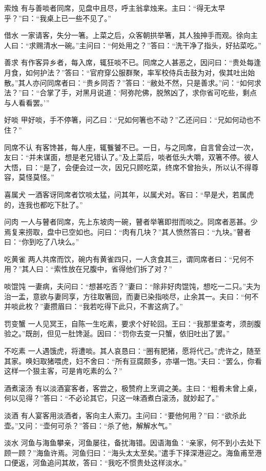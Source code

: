 \documentclass[12pt,UTF8]{ctexbook}
\begin{document}
索烛
有与善啖者同席，见盘中且尽，呼主翁拿烛来。主曰：“得无太早乎？”曰：“我桌上已一些不见了。”

借水
一家请客，失分一箸。上菜之后，众客朝拱举箸，其人独抻手而观。徐向主人曰：“求赐清水一碗。”主问曰：“何处用之？”答曰：“洗干净了指头，好拈菜吃。”

善求
有作客异乡者，每入席，辄狂啖不已。同席之人甚恶之，因问曰：“贵处每逢月食，如何护法？”答曰：“官府穿公服群聚，率军校侍兵击鼓为对，俟其吐出始散。”其人亦问同席者曰：“贵乡同否？”答曰：“敝处不然，只是善求。”问：“如何求法？”曰：“合掌了手，对黑月说道：‘阿弥陀佛，脱煞凶了，求你省可吃些，剩点与人看看罢。’”

好啖
甲好啖，手不停箸，问乙曰：“兄如何箸也不动？”乙还问曰：“兄如何动也不住？”

同席不认
有客馋甚，每人座，辄餮饕不已。一日，与之同席，自言曾会过一次，友曰：“并未谋面，想是老兄错认了。”及上菜后，啖者低头大嚼，双箸不停。彼人大悟，曰：“是了，会便会过一次，因兄只顾吃菜，终席不曾抬头，所以认不得尊容，莫怪莫怪。”

喜属犬
一酒客讶同席者饮啖太猛，问其年，以属犬对。客曰：“早是犬，若属虎的，连我也都吃下肚了。”

问肉
一人与瞽者同席，先上东坡肉一碗，瞽者举箸即拑而啖之。同席者恶甚。少焉复来捞取，盘中已空如也。问曰：“肉有几块？”其人愤然答曰：“九块。”瞽者曰：“你到吃了八块么。”

吃黄雀
两人共席而饮，碗内有黄雀四只，一人贪食其三，谓同席者曰：“兄何不用？”其人曰：“索性放在兄腹中，省得他们拆了对？”

啖馄饨
一妻病，夫问曰：“想甚吃否？”妻曰：“除非好肉馄饨，想吃一二只。”夫为治一盂，意欲与妻同享，方往取箸回，而妻已染指啖尽，止余其一。夫曰：“何不并啖此枚？”妻攒眉曰：“我若吃得下此只，不害这病了。”

罚变蟹
一人见冥王，自陈一生吃素，要求个好轮回。王曰：“我那里查考，须剖腹验之。”既剖，但见一肚馋涎。因曰：“罚你去变一只蟹，依旧吐出了罢。”

不吃素
一人遇饿虎，将遭啖。其人哀恳曰：“圈有肥猪，愿将代己。”虎许之，随至其家。唤妇取猪喂虎，妇不舍曰：“所有豆腐颇多，亦堪一饱。”夫曰：“罢么，你看这样一个狠主客，可是肯吃素的么？”

酒煮滚汤
有以淡酒宴客者，客尝之，极赞府上烹调之美。主曰：“粗肴未曾上桌，何以见得？”答曰：“不必论其它，只这一味酒煮白滚汤，就妙起了。”

淡酒
有人宴客用淡酒者，客向主人索刀。主问曰：“要他何用？”曰：“欲杀此壶。”又问：“壶何可杀？”答曰：“杀了他，解解水气。”

淡水
河鱼与海鱼攀亲，河鱼屡往，备扰海错。因语海鱼：“亲家，何不到小去处下顾一顾？”海鱼许焉。河鱼归曰：“海头太太至矣。”遣手下择深港迎之。海鱼甫至港口便返，河鱼追问其故，答曰：“我吃不惯贵处这样淡水。”
\end{document}
